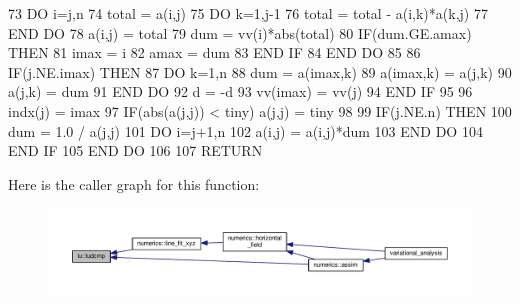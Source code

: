 \begin{DoxyCode}
73     \textcolor{keywordflow}{DO} i=j,n
74         total = a(i,j)
75         \textcolor{keywordflow}{DO} k=1,j-1
76             total = total - a(i,k)*a(k,j) 
77 \textcolor{keywordflow}{        END DO}
78         a(i,j) = total
79         dum = vv(i)*abs(total)
80         \textcolor{keywordflow}{IF}(dum.GE.amax) \textcolor{keywordflow}{THEN}
81             imax = i
82             amax = dum
83 \textcolor{keywordflow}{        END IF}
84 \textcolor{keywordflow}{    END DO}
85 
86     \textcolor{keywordflow}{IF}(j.NE.imax) \textcolor{keywordflow}{THEN}
87         \textcolor{keywordflow}{DO} k=1,n
88             dum = a(imax,k)
89             a(imax,k) = a(j,k)
90             a(j,k) = dum
91 \textcolor{keywordflow}{        END DO}
92         d = -d
93         vv(imax) = vv(j)
94 \textcolor{keywordflow}{    END IF}
95 
96     indx(j) = imax
97     \textcolor{keywordflow}{IF}(abs(a(j,j)) < tiny) a(j,j) = tiny
98 
99     \textcolor{keywordflow}{IF}(j.NE.n) \textcolor{keywordflow}{THEN}
100         dum = 1.0 / a(j,j)
101         \textcolor{keywordflow}{DO} i=j+1,n
102             a(i,j) = a(i,j)*dum
103 \textcolor{keywordflow}{        END DO}
104 \textcolor{keywordflow}{    END IF} 
105 \textcolor{keywordflow}{END DO}
106 
107 \textcolor{keywordflow}{RETURN}
\end{DoxyCode}


Here is the caller graph for this function\+:\nopagebreak
\begin{figure}[H]
\begin{center}
\leavevmode
\includegraphics[width=350pt]{namespacelu_a578a2275703e9c18d7f262f0a3482fbe_icgraph}
\end{center}
\end{figure}


